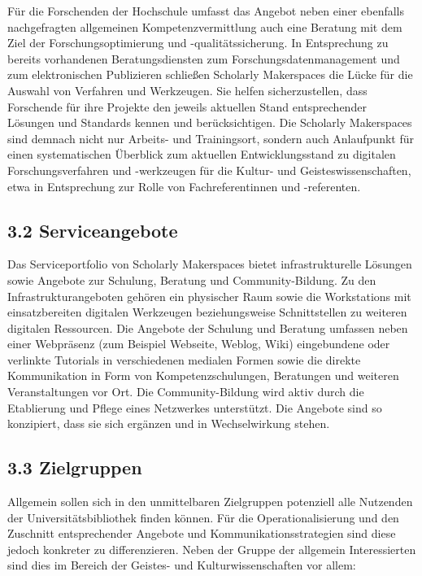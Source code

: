 \documentclass[a4paper,
fontsize=11pt,
oneside,
numbers=noperiodatend,
parskip=half-,
bibliography=totoc,
final
]{scrartcl}
\begin{document}
Für die Forschenden der Hochschule umfasst das Angebot neben einer
ebenfalls nachgefragten allgemeinen Kompetenzvermittlung auch eine
Beratung mit dem Ziel der Forschungsoptimierung und -qualitätssicherung.
In Entsprechung zu bereits vorhandenen Beratungsdiensten zum
Forschungsdatenmanagement und zum elektronischen Publizieren schließen
Scholarly Makerspaces die Lücke für die Auswahl von Verfahren und
Werkzeugen. Sie helfen sicherzustellen, dass Forschende für ihre
Projekte den jeweils aktuellen Stand entsprechender Lösungen und
Standards kennen und berücksichtigen. Die Scholarly Makerspaces sind
demnach nicht nur Arbeits- und Trainingsort, sondern auch Anlaufpunkt
für einen systematischen Überblick zum aktuellen Entwicklungsstand zu
digitalen Forschungsverfahren und -werkzeugen für die Kultur- und
Geisteswissenschaften, etwa in Entsprechung zur Rolle von
Fachreferentinnen und -referenten.

\hypertarget{serviceangebote}{%
\subsection{3.2 Serviceangebote}\label{serviceangebote}}

Das Serviceportfolio von Scholarly Makerspaces bietet infrastrukturelle
Lösungen sowie Angebote zur Schulung, Beratung und Community-Bildung. Zu
den Infrastrukturangeboten gehören ein physischer Raum sowie die
Workstations mit einsatzbereiten digitalen Werkzeugen beziehungsweise
Schnittstellen zu weiteren digitalen Ressourcen. Die Angebote der
Schulung und Beratung umfassen neben einer Webpräsenz (zum Beispiel
Webseite, Weblog, Wiki) eingebundene oder verlinkte Tutorials in
verschiedenen medialen Formen sowie die direkte Kommunikation in Form
von Kompetenzschulungen, Beratungen und weiteren Veranstaltungen vor
Ort. Die Community-Bildung wird aktiv durch die Etablierung und Pflege
eines Netzwerkes unterstützt. Die Angebote sind so konzipiert, dass sie
sich ergänzen und in Wechselwirkung stehen.

\hypertarget{zielgruppen}{%
\subsection{3.3 Zielgruppen}\label{zielgruppen}}

Allgemein sollen sich in den unmittelbaren Zielgruppen potenziell alle
Nutzenden der Universitätsbibliothek finden können. Für die
Operationalisierung und den Zuschnitt entsprechender Angebote und
Kommunikationsstrategien sind diese jedoch konkreter zu differenzieren.
Neben der Gruppe der allgemein Interessierten sind dies im Bereich der
Geistes- und Kulturwissenschaften vor allem:
\end{document}
